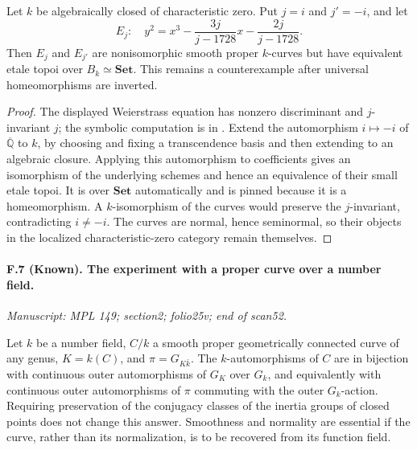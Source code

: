 Let $k$ be algebraically closed of characteristic zero. Put $j=i$ and
$j'=-i$, and let
\[
 E_j:\quad y^2=x^3-\frac{3j}{j-1728}x-\frac{2j}{j-1728}.
\]
Then $E_j$ and $E_{j'}$ are nonisomorphic smooth proper $k$-curves but
have equivalent etale topoi over $B_k\simeq\mathbf{Set}$. This remains a
counterexample after universal homeomorphisms are inverted.

\begin{proof}
The displayed Weierstrass equation has nonzero discriminant and
$j$-invariant $j$; the symbolic computation is in
. Extend the automorphism
$i\mapsto-i$ of $\overline{\mathbb Q}$ to $k$, by choosing and fixing a
transcendence basis and then extending to an algebraic closure. Applying
this automorphism to coefficients gives an isomorphism of the underlying
schemes and hence an equivalence of their small etale topoi. It is over
$\mathbf{Set}$ automatically and is pinned because it is a homeomorphism.
A $k$-isomorphism of the curves would preserve the $j$-invariant,
contradicting $i\ne-i$. The curves are normal, hence seminormal, so their
objects in the localized characteristic-zero category remain themselves.
\end{proof}

\paragraph{F.7 (Known). The experiment with a proper
curve over a number field.}
\textit{Manuscript: MPL 149; section2; folio25v; end of scan52.}

Let $k$ be a number field, $C/k$ a smooth proper geometrically connected
curve of any genus, $K=k(C)$, and
$\pi=G_{K\bar k}$. The $k$-automorphisms of $C$ are in bijection with
continuous outer automorphisms of $G_K$ over $G_k$, and equivalently with
continuous outer automorphisms of $\pi$ commuting with the outer
$G_k$-action. Requiring preservation of the conjugacy classes of the
inertia groups of closed points does not change this answer. Smoothness
and normality are essential if the curve, rather than its normalization,
is to be recovered from its function field.

